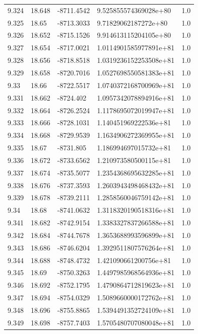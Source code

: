 \begin{tabular}{lllll}
9.324 & 18.648 & -8711.4542 & 9.525855574369028e+80 & 1.0 \\
9.325 & 18.65 & -8713.3033 & 9.71829062187272e+80 & 1.0 \\
9.326 & 18.652 & -8715.1526 & 9.914613115204105e+80 & 1.0 \\
9.327 & 18.654 & -8717.0021 & 1.0114901585977891e+81 & 1.0 \\
9.328 & 18.656 & -8718.8518 & 1.0319236152253508e+81 & 1.0 \\
9.329 & 18.658 & -8720.7016 & 1.0527698550581383e+81 & 1.0 \\
9.33 & 18.66 & -8722.5517 & 1.0740372168700969e+81 & 1.0 \\
9.331 & 18.662 & -8724.402 & 1.0957342078894916e+81 & 1.0 \\
9.332 & 18.664 & -8726.2524 & 1.1178695072019947e+81 & 1.0 \\
9.333 & 18.666 & -8728.1031 & 1.140451969222536e+81 & 1.0 \\
9.334 & 18.668 & -8729.9539 & 1.1634906272369955e+81 & 1.0 \\
9.335 & 18.67 & -8731.805 & 1.186994697015732e+81 & 1.0 \\
9.336 & 18.672 & -8733.6562 & 1.210973580500115e+81 & 1.0 \\
9.337 & 18.674 & -8735.5077 & 1.2354368695632285e+81 & 1.0 \\
9.338 & 18.676 & -8737.3593 & 1.2603943498468432e+81 & 1.0 \\
9.339 & 18.678 & -8739.2111 & 1.2858560046759142e+81 & 1.0 \\
9.34 & 18.68 & -8741.0632 & 1.3118320190518316e+81 & 1.0 \\
9.341 & 18.682 & -8742.9154 & 1.3383327837266588e+81 & 1.0 \\
9.342 & 18.684 & -8744.7678 & 1.3653688993596899e+81 & 1.0 \\
9.343 & 18.686 & -8746.6204 & 1.3929511807576264e+81 & 1.0 \\
9.344 & 18.688 & -8748.4732 & 1.421090661200756e+81 & 1.0 \\
9.345 & 18.69 & -8750.3263 & 1.4497985968564936e+81 & 1.0 \\
9.346 & 18.692 & -8752.1795 & 1.4790864712819623e+81 & 1.0 \\
9.347 & 18.694 & -8754.0329 & 1.5089660000172762e+81 & 1.0 \\
9.348 & 18.696 & -8755.8865 & 1.5394491352724109e+81 & 1.0 \\
9.349 & 18.698 & -8757.7403 & 1.5705480707080048e+81 & 1.0 \\

\end{tabular}

